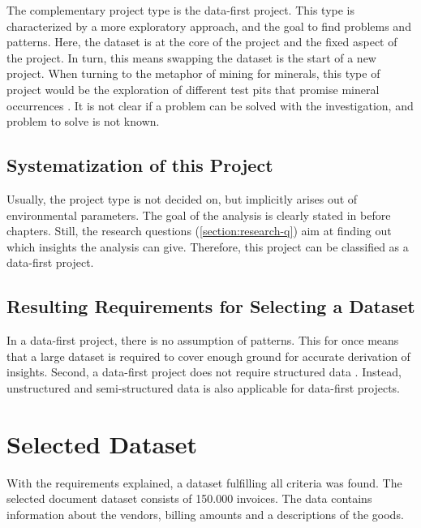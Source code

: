 	The complementary project type is the data-first project. This type is characterized by a more exploratory approach, and the goal to find problems and patterns. Here, the dataset is at the core of the project and the fixed aspect of the project. In turn, this means swapping the dataset is the start of a new project. When turning to the metaphor of mining for minerals, this type of project would be the exploration of different test pits that promise mineral occurrences \cite{dataScienceProjectTypes}. It is not clear if a problem can be solved with the investigation, and problem to solve is not known.
	
	\subsection{Systematization of this Project}
	Usually, the project type is not decided on, but implicitly arises out of environmental parameters. The goal of the analysis is clearly stated in before chapters. Still, the research questions (\ref{section:research-q}) aim at finding out which insights the analysis can give. Therefore, this project can be classified as a data-first project.
	
	\subsection{Resulting Requirements for Selecting a Dataset}
	In a data-first project, there is no assumption of patterns. This for once means that a large dataset is required to cover enough ground for accurate derivation of insights. Second, a data-first project does not require structured data \cite{srivastavaDataMining}. Instead, unstructured and semi-structured data is also applicable for data-first projects.
	
	
	\section{Selected Dataset}
	With the requirements explained, a dataset fulfilling all criteria was found. The selected document dataset consists of 150.000 invoices. The data contains information about the vendors, billing amounts and a descriptions of the goods. 
	
	
